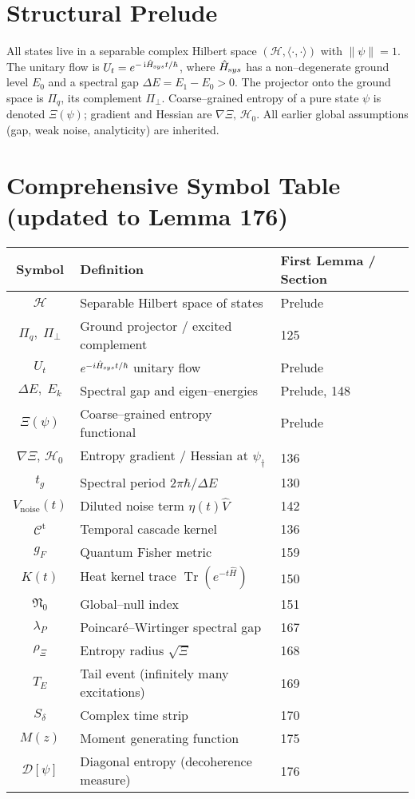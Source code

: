 \documentclass[11pt]{article}
\begin{document}
\section*{Structural Prelude}
All states live in a separable complex Hilbert space $(\mathcal H,\langle\cdot,\cdot\rangle)$ with $\|\psi\|=1$.  
The unitary flow is $U_t=e^{-\,\mathrm i\hat H_{\text sys}t/\hbar}$, where $\hat H_{\text sys}$ has a non--degenerate ground level $E_0$ and a spectral gap $\Delta E=E_1-E_0>0$.  
The projector onto the ground space is $\Pi_q$, its complement $\Pi_\perp$.  
Coarse--grained entropy of a pure state $\psi$ is denoted $\Xi(\psi)$; gradient and Hessian are $\nabla\Xi,\,\mathcal H_0$.  
All earlier global assumptions (gap, weak noise, analyticity) are inherited.

\section*{Comprehensive Symbol Table (updated to Lemma 176)}
\begin{longtable}{|c|p{}|p{}|}
\hline
\textbf{Symbol} & \textbf{Definition} & \textbf{First Lemma / Section}\\\hline
$\mathcal H$ & Separable Hilbert space of states & Prelude\\\hline
$\Pi_q,\;\Pi_\perp$ & Ground projector / excited complement & 125\\\hline
$U_t$ & $e^{-i\hat H_{\text sys}t/\hbar}$ unitary flow & Prelude\\\hline
$\Delta E,\;E_k$ & Spectral gap and eigen--energies & Prelude, 148\\\hline
$\Xi(\psi)$ & Coarse--grained entropy functional & Prelude\\\hline
$\nabla\Xi,\,\mathcal H_0$ & Entropy gradient / Hessian at $\psi_\dagger$ & 136\\\hline
$t_g$ & Spectral period $2\pi\hbar/\Delta E$ & 130\\\hline
$V_{\text{noise}}(t)$ & Diluted noise term $\eta(t)\hat V$ & 142\\\hline
$\mathcal C^{\mathrm t}$ & Temporal cascade kernel & 136\\\hline
$g_F$ & Quantum Fisher metric & 159\\\hline
$K(t)$ & Heat kernel trace $\operatorname{Tr}(e^{-t\hat H})$ & 150\\\hline
$\mathfrak N_0$ & Global--null index & 151\\\hline
$\lambda_P$ & Poincar\'e--Wirtinger spectral gap & 167\\\hline
$\rho_\Xi$ & Entropy radius $\sqrt{\Xi}$ & 168\\\hline
$T_E$ & Tail event (infinitely many excitations) & 169\\\hline
$S_\delta$ & Complex time strip & 170\\\hline
$M(z)$ & Moment generating function & 175\\\hline
$\mathscr D[\psi]$ & Diagonal entropy (decoherence measure) & 176\\\hline
\end{longtable}
\end{document}
